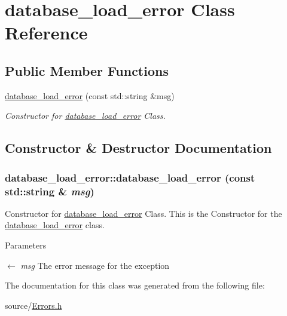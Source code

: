 \hypertarget{classdatabase__load__error}{
\section{database\_\-load\_\-error Class Reference}
\label{classdatabase__load__error}
}
\subsection*{Public Member Functions}
\begin{DoxyCompactItemize}
\item 
\hyperlink{classdatabase__load__error_adfe936915a1470e830024c4278c68aa2}{database\_\-load\_\-error} (const std::string \&msg)
\begin{DoxyCompactList}\small\item\em Constructor for \hyperlink{classdatabase__load__error}{database\_\-load\_\-error} Class. \item\end{DoxyCompactList}\end{DoxyCompactItemize}


\subsection{Constructor \& Destructor Documentation}
\hypertarget{classdatabase__load__error_adfe936915a1470e830024c4278c68aa2}{
\subsubsection[{database\_\-load\_\-error}]{\setlength{\rightskip}{0pt plus 5cm}database\_\-load\_\-error::database\_\-load\_\-error (const std::string \& {\em msg})}}
\label{classdatabase__load__error_adfe936915a1470e830024c4278c68aa2}


Constructor for \hyperlink{classdatabase__load__error}{database\_\-load\_\-error} Class. This is the Constructor for the \hyperlink{classdatabase__load__error}{database\_\-load\_\-error} class. 
\begin{DoxyParams}{Parameters}
\item[\mbox{$\leftarrow$} {\em msg}]The error message for the exception \end{DoxyParams}


The documentation for this class was generated from the following file:\begin{DoxyCompactItemize}
\item 
source/\hyperlink{Errors_8h}{Errors.h}\end{DoxyCompactItemize}
